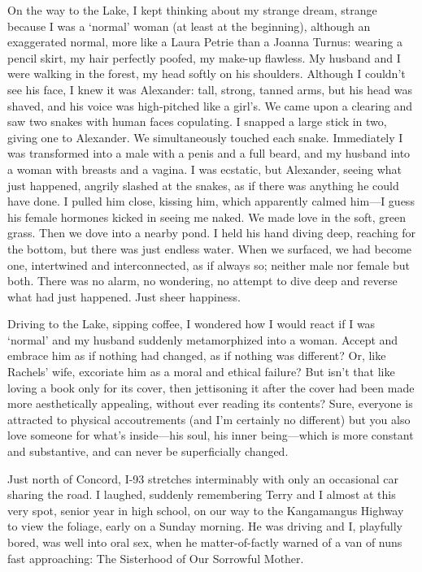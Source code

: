 On the way to the Lake, I kept thinking about my strange dream, strange
because I was a `normal' woman (at least at the beginning), although an
exaggerated normal, more like a Laura Petrie than a Joanna Turnus:
wearing a pencil skirt, my hair perfectly poofed, my make-up flawless.
My husband and I were walking in the forest, my head softly on his
shoulders. Although I couldn't see his face, I knew it was Alexander:
tall, strong, tanned arms, but his head was shaved, and his voice was
high-pitched like a girl's. We came upon a clearing and saw two snakes
with human faces copulating. I snapped a large stick in two, giving one
to Alexander. We simultaneously touched each snake. Immediately I was
transformed into a male with a penis and a full beard, and my husband
into a woman with breasts and a vagina. I was ecstatic, but Alexander,
seeing what just happened, angrily slashed at the snakes, as if there
was anything he could have done. I pulled him close, kissing him, which
apparently calmed him---I guess his female hormones kicked in seeing me
naked. We made love in the soft, green grass. Then we dove into a nearby
pond. I held his hand diving deep, reaching for the bottom, but there
was just endless water. When we surfaced, we had become one, intertwined
and interconnected, as if always so; neither male nor female but both.
There was no alarm, no wondering, no attempt to dive deep and reverse
what had just happened. Just sheer happiness.

Driving to the Lake, sipping coffee, I wondered how I would react if I
was `normal' and my husband suddenly metamorphized into a woman. Accept
and embrace him as if nothing had changed, as if nothing was different?
Or, like Rachels' wife, excoriate him as a moral and ethical failure?
But isn't that like loving a book only for its cover, then jettisoning
it after the cover had been made more aesthetically appealing, without
ever reading its contents? Sure, everyone is attracted to physical
accoutrements (and I'm certainly no different) but you also love someone
for what's inside---his soul, his inner being---which is more constant
and substantive, and can never be superficially changed.

Just north of Concord, I-93 stretches interminably with only an
occasional car sharing the road. I laughed, suddenly remembering Terry
and I almost at this very spot, senior year in high school, on our way
to the Kangamangus Highway to view the foliage, early on a Sunday
morning. He was driving and I, playfully bored, was well into oral sex,
when he matter-of-factly warned of a van of nuns fast approaching: The
Sisterhood of Our Sorrowful Mother.

